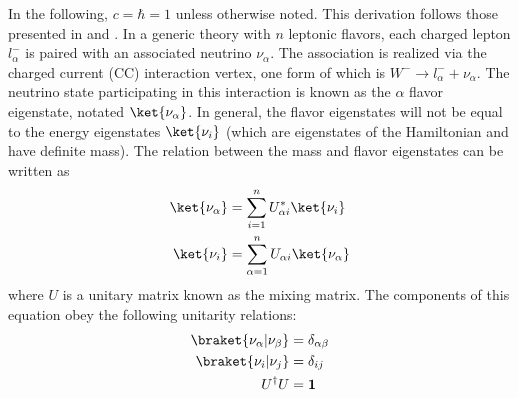 In the following, $c = \hbar = 1$ unless otherwise noted.
This derivation follows those presented in \cite{neutrino_textbook}
and \cite{huang_thesis}.
In a generic theory with $n$ leptonic flavors,
each charged lepton $l_\alpha^-$ is paired with
an associated neutrino $\nu_\alpha$.
The association is realized via the charged current (CC) interaction vertex,
one form of which is $W^- \to l_\alpha^- + \nu_\alpha$.
The neutrino state participating in this interaction
is known as the $\alpha$ flavor eigenstate, notated $\ket{\nu_\alpha}$.
In general, the flavor eigenstates will not be equal to the energy eigenstates
$\ket{\nu_i}$
(which are eigenstates of the Hamiltonian and have definite mass).
The relation between the mass and flavor eigenstates can be written as
\begin{align}\label{eq:general_eigenstates}
    \begin{split}
        \ket{\nu_\alpha} &= \sum_{i=1}^n U^*_{\alpha i} \ket{\nu_i} \\
        \ket{\nu_i} &= \sum_{\alpha=1}^n U_{\alpha i} \ket{\nu_\alpha}
    \end{split}
\end{align}
where $U$ is a unitary matrix known as the mixing matrix.
The components of this equation obey the following unitarity relations:
\begin{align}\label{eq:unitarity}
    \begin{split}
        \braket{\nu_\alpha | \nu_\beta} &= \delta_{\alpha\beta} \\
        \braket{\nu_i | \nu_j} &= \delta_{ij} \\
        U^\dagger U &= \mathbf{1}
    \end{split}
\end{align}

